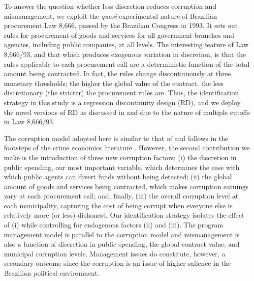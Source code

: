 \documentclass[11pt]{article}
\begin{document}
To answer the question whether less discretion reduces corruption and mismanagement, we exploit the \emph{quasi}-experimental nature of Brazilian procurement Law 8,666, passed by the Brazilian Congress in 1993. It sets out rules for procurement of goods and services for all government branches and agencies, including public companies, at all levels. The interesting feature of Law 8,666/93, and that which produces exogenous variation in discretion, is that the rules applicable to each procurement call are a deterministic function of the total amount being contracted. In fact, the rules change discontinuously at three monetary thresholds; the higher the global value of the contract, the less discretionary (the stricter) the procurement rules are. Thus, the identification strategy in this study is a regression discontinuity design (RD), and we deploy the novel versions of RD as discussed in \citet{CalonicoRobustNonparametricConfidence2014,CalonicoOptimalDataDrivenRegression2015} and \citet{CattaneoInterpretingRegressionDiscontinuity2016,CattaneoAnalysisRegressionDiscontinuity2018} due to the nature of multiple cutoffs in Law 8,666/93.

The corruption model adopted here is similar to that of \citet{OlkenCorruptionDevelopingCountries2012b} and follows in the footsteps of the crime economics literature \citep{BeckerCrimePunishmentEconomic1968,StiglerOptimumEnforcementLaws1970,BeckerLawEnforcementMalfeasance1974,Rose-AckermanEconomicsCorruption1975}. However, the second contribution we make is the introduction of three new corruption factors: (i) the discretion in public spending, our most important variable, which determines the ease with which public agents can divert funds without being detected; (ii) the global amount of goods and services being contracted, which makes corruption earnings vary at each procurement call; and, finally, (iii) the overall corruption level at each municipality, capturing the cost of being corrupt when everyone else is relatively more (or less) dishonest. Our identification strategy isolates the effect of (i) while controlling for endogenous factors (ii) and (iii). The program management model is parallel to the corruption model and mismanagement is also a function of discretion in public spending, the global contract value, and municipal corruption levels. Management issues do constitute, however, a secondary outcome since the corruption is an issue of higher salience in the Brazilian political environment.
\end{document}
